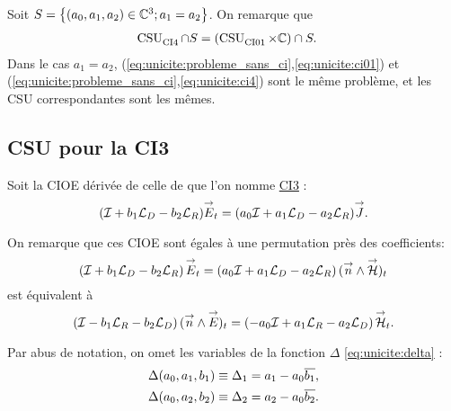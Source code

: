   Soit \(S = \left\lbrace (a_0,a_1,a_2) \in \mathbb C^3 ; a_1 = a_2 \right\rbrace \). On remarque que
  \begin{align}
    \operatorname{CSU}_{\operatorname{CI4}}^{{}}\cap S &= (\operatorname{CSU}_{\operatorname{CI01}}^{{}}\times\mathbb C)\cap S. 
  \end{align}
  Dans le cas \(a_1=a_2\), (\eqref{eq:unicite:probleme_sans_ci},\eqref{eq:unicite:ci01}) et (\eqref{eq:unicite:probleme_sans_ci},\eqref{eq:unicite:ci4}) sont le même problème, et les CSU correspondantes sont les mêmes.
\subsection{CSU pour la CI3}

  Soit la CIOE dérivée de celle de \cite{marceaux_high-order_2000} que l'on nomme \hyperlink{ci3}{CI3} :
  \begin{equation}
    \label{eq:unicite:ci3:ci3}
    ( {\mathcal{I}} + b_1 {\mathcal{L}_D} - b_2 {\mathcal{L}_R}){\overset{\rightarrow}{E}}_t = (a_0{\mathcal{I}} + a_1 {\mathcal{L}_D} - a_2 {\mathcal{L}_R} ) {\overset{\rightarrow}{J}}.
  \end{equation}

  On remarque que ces CIOE sont égales à une permutation près des coefficients:
  \begin{equation*}
    \left({\mathcal{I}} + b_1 {\mathcal{L}_D} - b_2 {\mathcal{L}_R}\right){\overset{\rightarrow}{E}}_t = \left(a_0{\mathcal{I}} + a_1 {\mathcal{L}_D} - a_2{\mathcal{L}_R}\right)({\overset{\rightarrow}{n}} \wedge {\overset{\rightarrow}{\mathcal{H}}})_t
  \end{equation*}
  est équivalent à
  \begin{equation*}
    \left({\mathcal{I}} - b_1 {\mathcal{L}_R} - b_2 {\mathcal{L}_D}\right)({\overset{\rightarrow}{n}} \wedge {\overset{\rightarrow}{E}})_t = \left(-a_0{\mathcal{I}} + a_1 {\mathcal{L}_R} - a_2{\mathcal{L}_D}\right){\overset{\rightarrow}{\mathcal{H}}}_t.
  \end{equation*}

  Par abus de notation, on omet les variables de la fonction \(\Delta\) \eqref{eq:unicite:delta} :
  \begin{align*}
     \Delta(a_0,a_1,b_1) &\equiv \Delta_1 = a_1 - a_0{\overline{b_1}},
     \\
     \Delta(a_0,a_2,b_2) &\equiv \Delta_2 = a_2 - a_0{\overline{b_2}}.
  \end{align*}

